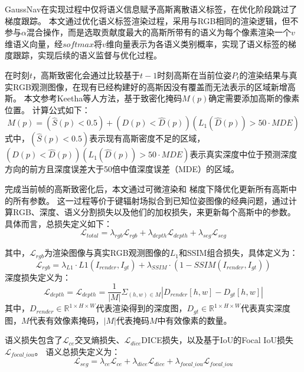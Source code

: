 GaussNav在实现过程中仅将语义信息赋予高斯离散语义标签，在优化阶段跳过了梯度跟踪。
本文通过优化语义标签渲染过程，采用与RGB相同的渲染逻辑，但不参与$\alpha$混合操作，而是选取贡献度最大的高斯所带有的语义为每个像素渲染一个$v$维语义向量，经$softmax$将$v$维向量表示为各语义类别概率，实现了语义标签的梯度跟踪，实现后续的语义监督与优化过程。

在时刻$t$，高斯致密化会通过比较基于$t-1$时刻高斯在当前位姿$P_t$的渲染结果与真实RGB观测图像，在现有已经构建好的高斯因没有覆盖而无法表示的区域新增高斯。
本文参考Keetha\cite{keetha2024splatam}等人方法，基于致密化掩码$M(p)$确定需要添加高斯的像素位置。
计算公式如下：
\begin{equation}
    M(p)=(\hat{S}(p)<0.5)+(D(p)<\hat{D}(p))(L_1(\hat{D}(p))>50 \cdot MDE)
\end{equation}
式中，$(\hat{S}(p)<0.5)$表示现有高斯密度不足的区域，$(D(p)<\hat{D}(p))(L_1(\hat{D}(p))>50 \cdot MDE)$表示真实深度中位于预测深度方向的前方且深度误差大于50倍中值深度误差（MDE）的区域。

完成当前帧的高斯致密化后，本文通过可微渲染和 梯度下降优化更新所有高斯中的所有参数。
这一过程等价于键辐射场拟合到已知位姿图像的经典问题，通过计算RGB、深度、语义分割损失以及他们的加权损失，来更新每个高斯中的参数。
具体而言，总损失定义如下：
\begin{equation}
    \mathcal{L} _{total}=\lambda _{rgb} \mathcal{L}_{rgb}+\lambda _{depth} \mathcal{L}_{depth}+\lambda _{seg} \mathcal{L}_{seg}
\end{equation}

其中，$\mathcal{L} _{rgb}$为渲染图像与真实RGB观测图像的$L_1$和SSIM组合损失，具体定义为：
\begin{equation}
    \mathcal{L}_{rgb}=\lambda_{L1} \cdot L1(I_{render},I_{gt})+\lambda_{SSIM}\cdot (1-SSIM(I_{render},I_{gt})) 
\end{equation}
深度损失定义为：
\begin{equation}
    \mathcal{L}_{depth}=\mathcal{L} _{depth}=\frac{1}{| M | }\Sigma _{(h,w)\in M}|D_{render}[h,w]-D_{gt}[h,w]|
\end{equation}
其中，$D_{render} \in \mathbb{R} ^{1\times H \times W}$代表渲染得到的深度图，$D_{gt} \in \mathbb{R} ^{1\times H \times W}$代表真实深度图，$M$代表有效像素掩码，$|M|$代表掩码$M$中有效像素的数量。

语义损失包含了$\mathcal{L} _{ce}$交叉熵损失、$\mathcal{L} _{dice}$DICE损失，以及基于IoU的Focal IoU损失$\mathcal{L} _{focal\_iou}$。
语义总损失定义为：
\begin{equation}
    \mathcal{L}_{seg}=\lambda_{ce} \mathcal{L}_{ce}+\lambda_{dice} \mathcal{L}_{dice}+\lambda_{focal\_iou} \mathcal{L}_{focal\_iou}
\end{equation}

